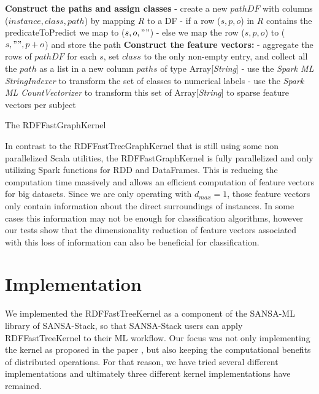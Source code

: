 \documentclass{easychair}
\begin{document}
\begin{algorithm}
 \label{alg:FastGK}
 \;

\textbf{Construct the paths and assign classes}\; \Indp
- create a new $pathDF$ with columns ($instance,class,path$) by mapping $R$ to a DF\; \Indp
- if a row ($s,p,o$) in $R$ contains the predicateToPredict we map to ($s,o,""$)\;
- else we map the row ($s,p,o$) to ($s,"",p+o$) and store the path\; \Indm \Indm
 \;
 \textbf{Construct the feature vectors:}\; \Indp
 - aggregate the rows of $pathDF$ for each $s$, set $class$ to the only non-empty entry, and collect all the $path$ as a list in a new column $paths$ of type Array[\textit{String}]\;
 - use the \textit{Spark ML StringIndexer} to transform the set of classes to numerical labels\;
 - use the \textit{Spark ML CountVectorizer} to transform this set of Array[\textit{String}] to sparse feature vectors per subject\;
 \;
\caption{The RDFFastGraphKernel}
\end{algorithm}

In contrast to the RDFFastTreeGraphKernel that is still using some non parallelized Scala utilities, the RDFFastGraphKernel is fully parallelized and only utilizing Spark functions for RDD and DataFrames. This is reducing the computation time massively and allows an efficient computation of feature vectors for big datasets. Since we are only operating with $d_{max}=1$, those feature vectors only contain information about the direct surroundings of instances. In some cases this information may not be enough for classification algorithms, however our tests show that the dimensionality reduction of feature vectors associated with this loss of information can also be beneficial for classification.
\section{Implementation}
\label{sect:Implementation}

We implemented the RDFFastTreeKernel as a component of the SANSA-ML library of SANSA-Stack, so that SANSA-Stack users can apply RDFFastTreeKernel to their ML workflow. Our focus was not only implementing the kernel as proposed in the paper \cite{FGK}, but also keeping the computational benefits of distributed operations. For that reason, we have tried several different implementations and ultimately three different kernel implementations have remained.
\end{document}
